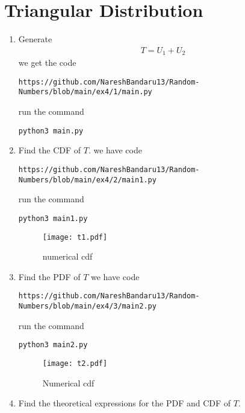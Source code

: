 \documentclass[journal,12pt,twocolumn]{IEEEtran}
\renewcommand\thesection{\arabic{section}}
\begin{document}
\section{Triangular Distribution}
\begin{enumerate}[label=\thesection.\arabic*
,ref=\thesection.\theenumi]
%
\item Generate 
	\begin{align}
		T = U_1+U_2
	\end{align}
we get the code
\begin{lstlisting}
https://github.com/NareshBandaru13/Random-Numbers/blob/main/ex4/1/main.py
\end{lstlisting}
run the command
\begin{lstlisting}
python3 main.py
\end{lstlisting}

\item Find the CDF of $T$.
we have code
\begin{lstlisting}
https://github.com/NareshBandaru13/Random-Numbers/blob/main/ex4/2/main1.py
\end{lstlisting}
run the command
\begin{lstlisting}
python3 main1.py
\end{lstlisting}
\begin{figure}[H]
    \centering
    \texttt{[image: t1.pdf]}
    \caption{numerical cdf}
    \label{fig:my_cdf1}
\end{figure}

\item Find the PDF of $T$
we have code
\begin{lstlisting}
https://github.com/NareshBandaru13/Random-Numbers/blob/main/ex4/3/main2.py
\end{lstlisting}
run the command
\begin{lstlisting}
python3 main2.py
\end{lstlisting}

\begin{figure}[H]
    \centering
    \texttt{[image: t2.pdf]}
    \caption{Numerical cdf}
    \label{fig:my_cdf2}
\end{figure}

\item Find the theoretical expressions for the PDF and CDF of $T$.
\solution


\end{enumerate}
\end{document}
